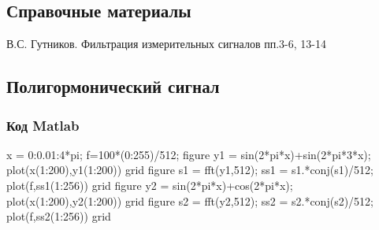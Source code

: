 \documentclass[10pt,a4paper]{article}
\begin{document}
\subsection{Справочные материалы}
В.С. Гутников. Фильтрация измерительных сигналов пп.3-6, 13-14
\subsection{Полигормонический сигнал}
\subsubsection{Код Matlab}
x = 0:0.01:4*pi;\newline
f=100*(0:255)/512; \newline
figure\newline
y1 = sin(2*pi*x)+sin(2*pi*3*x);\newline
plot(x(1:200),y1(1:200))\newline
grid\newline
figure\newline
s1 = fft(y1,512);\newline
ss1 = s1.*conj(s1)/512;\newline
plot(f,ss1(1:256))\newline
grid \newline
figure\newline
y2 = sin(2*pi*x)+cos(2*pi*x);  \newline
plot(x(1:200),y2(1:200))  \newline 
grid \newline
figure\newline
s2 = fft(y2,512);\newline
ss2 = s2.*conj(s2)/512;\newline
plot(f,ss2(1:256))\newline
grid \newline
\end{document}
